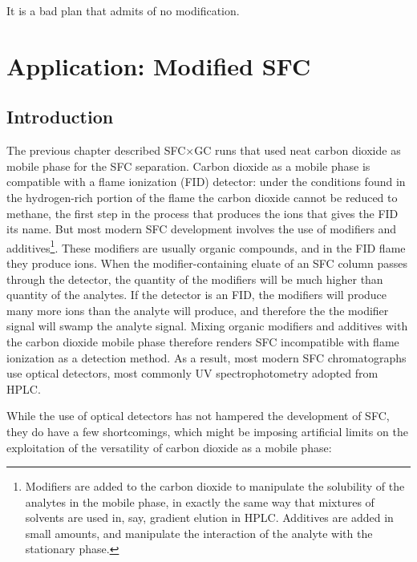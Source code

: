 
\begin{savequote}[\quotewidth]
It is a bad plan that admits of no modification.
\end{savequote}

\chapter{Application: Modified SFC} %

\label{Chapter7} %

\section{Introduction}

The previous chapter described SFC×GC runs that used neat carbon dioxide as
mobile phase for the SFC separation. Carbon dioxide as a mobile phase is
compatible with a flame ionization (FID) detector: under the conditions found in
the hydrogen-rich portion of the flame the carbon dioxide cannot be reduced to
methane, the first step in the process that produces the ions that gives the FID
its name. But most modern SFC development involves the use of modifiers and
additives\footnote{Modifiers are added to the carbon dioxide to manipulate the
solubility of the analytes in the mobile phase, in exactly the same way that
mixtures of solvents are used in, say, gradient elution in HPLC. Additives are
added in small amounts, and manipulate the interaction of the analyte with the
stationary phase.}. These modifiers are usually organic compounds, and in the
FID flame they produce ions. When the modifier-containing eluate of an SFC
column passes through the detector, the quantity of the modifiers will be much
higher than quantity of the analytes. If the detector is an FID, the modifiers
will produce many more ions than the analyte will produce, and therefore the the
modifier signal will swamp the analyte signal. Mixing organic modifiers and
additives with the carbon dioxide mobile phase therefore renders SFC
incompatible with flame ionization as a detection method. As a result, most
modern SFC chromatographs use optical detectors, most commonly UV
spectrophotometry adopted from HPLC.

While the use of optical detectors has not hampered the development of SFC,
they do have a few shortcomings, which might be imposing artificial limits on
the exploitation of the versatility of carbon dioxide as a mobile phase:

